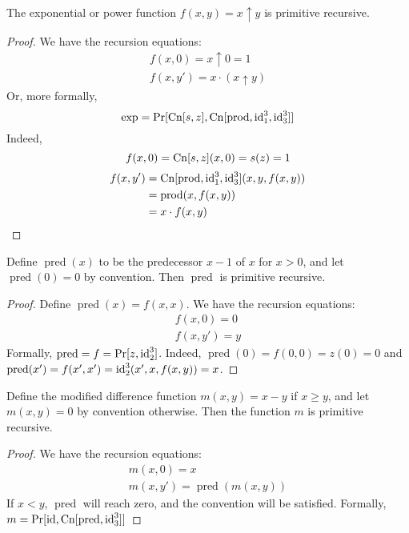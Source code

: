 \begin{exercise}
  The exponential or power function $f(x,y) = x \uparrow y$ is primitive recursive.
\end{exercise}
\begin{proof}
  We have the recursion equations:
  \begin{gather*}
    f(x,0) = x \uparrow 0 = 1\\
    f(x,y') = x \cdot (x \uparrow y)
  \end{gather*}
  Or, more formally,
  \begin{equation*}
    \operatorname{exp} = \Pr[\operatorname{Cn}[s, z], \operatorname{Cn}[\operatorname{prod}, \operatorname{id}_1^3, \operatorname{id}_3^3]]
  \end{equation*}
  Indeed,
  \begin{equation*}
    f(x, 0) = \operatorname{Cn}[s, z](x, 0) = s(z) = 1
  \end{equation*}
  \begin{align*}
    f(x, y') &= \operatorname{Cn}[\operatorname{prod}, \operatorname{id}_1^3, \operatorname{id}_3^3](x, y, f(x, y))\\
    &= \operatorname{prod}(x, f(x, y)) \\
    &= x \cdot f(x, y)
  \end{align*}
\end{proof}

\begin{exercise}
  \newcommand{\pred}{\operatorname{pred}}
  Define $\pred(x)$ to be the predecessor $x-1$ of $x$ for $x > 0$, and let $\pred(0) = 0$ by convention.
  Then $\pred$ is primitive recursive.
  \begin{proof}
    Define $\pred(x) = f(x, x)$.
    We have the recursion equations:
    \begin{gather*}
      f(x, 0) = 0\\
      f(x, y') = y
    \end{gather*}
    Formally, $\pred = f = \Pr[z, \id_2^3]$.
    Indeed, $\pred(0) = f(0, 0) = z(0) = 0$ and $\pred(x') = f(x', x') = \id_2^3(x', x, f(x, y)) = x$.
  \end{proof}
\end{exercise}

\begin{exercise}
  \newcommand{\pred}{\operatorname{pred}}
  Define the modified difference function $m(x, y) = x - y$ if $x \ge y$, and let $m(x, y) = 0$ by convention otherwise.
  Then the function $m$ is primitive recursive.
  \begin{proof}
    We have the recursion equations:
    \begin{gather*}
      m(x, 0) = x\\
      m(x, y') = \pred(m(x,y))
    \end{gather*}
    If $x < y$, $\pred$ will reach zero, and the convention will be satisfied.
    Formally, $m = \Pr[\id, \Cn[\pred, \id_3^3]]$
  \end{proof}
\end{exercise}

